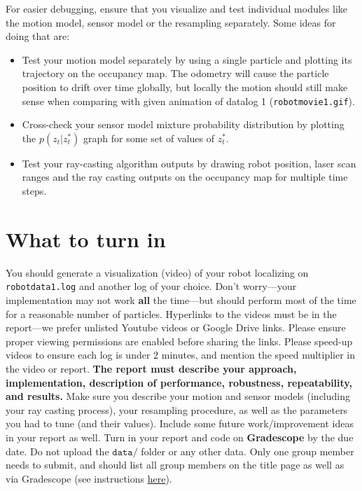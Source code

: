 \documentclass[12pt, a4paper]{article}
\begin{document}
For easier debugging, ensure that you visualize and test individual
modules like the motion model, sensor model or the resampling separately.
Some ideas for doing that are:
\begin{itemize}
	\item Test your motion model separately by using a single particle and plotting
	      its trajectory on the occupancy map. The odometry will cause the
	      particle position to drift over time globally, but locally the motion
	      should still make sense when comparing with given animation of datalog
	      1 (\texttt{robotmovie1.gif}).
	\item Cross-check your sensor model mixture probability distribution by
	      plotting the $p(z_t|z^*_t)$ graph for some set of values of $z^*_t$.
	\item Test your ray-casting algorithm outputs by drawing robot position,
	      laser scan ranges and the ray casting outputs on the occupancy map
	      for multiple time steps.
\end{itemize}

\section{What to turn in}

You should generate a visualization (video) of your robot localizing
on \texttt{robotdata1.log} and another log of your choice. Don't
worry---your implementation may not work \textbf{all }the time---but
should perform most of the time for a reasonable number of particles.
Hyperlinks to the videos must be in the report---we prefer unlisted
Youtube videos or Google Drive links. Please ensure proper viewing
permissions are enabled before sharing the links. Please speed-up
videos to ensure each log is under 2 minutes, and mention the speed
multiplier in the video or report. \textbf{The report must describe
	your approach, implementation, description of performance, robustness,
	repeatability, and results.} Make sure you describe your motion and
sensor models (including your ray casting process), your resampling procedure, as well as the parameters
you had to tune (and their values). Include some future work/improvement
ideas in your report as well. Turn in your report\textbf{ }and code
on \textbf{Gradescope} by the due date. Do not upload the $\mathtt{data/}$
folder or any other data. Only one group member needs to submit, and should
list all group members on the title page as well as via Gradescope (see instructions
\href{https://help.gradescope.com/article/m5qz2xsnjy-student-add-group-members}{here}).
\end{document}
